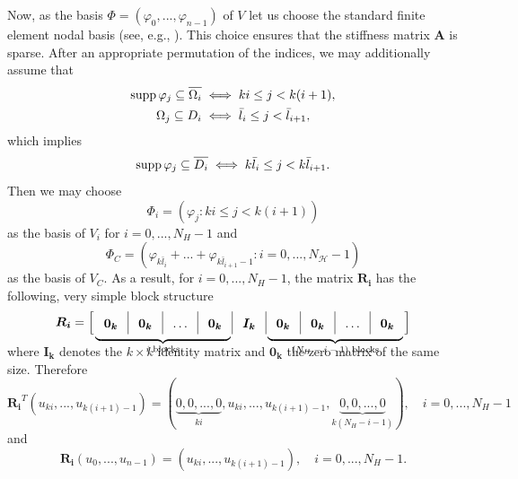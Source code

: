 \documentclass[11pt]{article}
\newcommand*{\closure}[1]{
	\ensuremath{\overline{\raisebox{0pt}[1.1\height]{$#1$}}}
}
\theoremstyle{definition}
\theoremstyle{theorem}
\begin{document}
Now, as the basis $\Phi=(\varphi_0, ..., \varphi_{n-1})$ of $V$ let us choose the
standard finite element nodal basis (see, e.g., \cite{Brenner}). This choice
ensures that the stiffness matrix $\bm{A}$ is sparse.
After an appropriate permutation of the indices, we may additionally assume that
\begin{align*}
\operatorname{supp} \varphi_j \subseteq \closure{\Omega_i} &\iff ki \leq j <  k(i + 1),\\
\Omega_j \subseteq D_i &\iff \bar l_{i} \leq j < \bar l_{i + 1},
\end{align*}
which implies
\begin{equation}
\operatorname{supp} \varphi_j \subseteq \closure{D_i}\iff k\bar l_{i} \leq j < k \bar l_{i + 1}.\label{l_i_res}
\end{equation}
Then we may choose
\[
\Phi_i = \left(\varphi_{j} : ki \leq j <  k(i + 1)\right)
\]
as the basis of $V_i$ for $i=0,...,N_H-1$ and
\[
\Phi_C = \left(\varphi_{k\bar l_{i}} + ... + \varphi_{k \bar l_{i + 1}-1} :
  i=0,...,N_{\mathcal{H}}-1\right)
\]
as the basis of $V_C$. As a result, for $i=0,...,N_H-1$, the matrix
$\bm{R_i}$ has the following, very simple block structure
\newcommand\undermat[2]{%
  \makebox[0pt][l]{%
    $\smash{\kern-0.85\arraycolsep
      \underbrace{\phantom{\kern\arraycolsep\begin{matrix}#2\end{matrix}\kern0.85\arraycolsep}}_{\text{$#1$}}}$}#2}
\begin{equation}
\arraycolsep=8pt\def\arraystretch{1.5}
  \bm{R_i}=\left[\begin{array}{c|c|c|c|c|c|c|c|c}
      \undermat{i\text{ blocks}}{\bm{0_k} & \bm{0_k} & \dots & \bm{0_k}} &
      \bm{I_k} &
      \undermat{(N_H - i - 1)\text{ blocks}}{\bm{0_k} & \bm{0_k} & \dots & \bm{0_k}}\\
  \end{array}\right]\vspace{20pt}
  \label{Ri_structure}
\end{equation}
where $\bm{I_k}$ denotes the $k\times k$ identity matrix and $\bm{0_k}$
the zero matrix of the same size. Therefore
\begin{equation}
  \bm{R_i}^T(u_{ki}, ..., u_{k(i + 1) - 1})=
    (\underbrace{0, 0, ..., 0}_{ki}, u_{ki}, ..., u_{k(i + 1) - 1},
    \underbrace{0, 0, ..., 0}_{k(N_H - i - 1)}),\quad i=0,...,N_H-1\label{R_i_T_effect}
\end{equation}
and
\begin{equation}
  \bm{R_i}(u_0, ..., u_{n-1}) = (u_{ki}, ..., u_{k(i + 1) - 1}),\quad i=0,...,N_H-1.\label{R_i_effect}
\end{equation}
\end{document}
